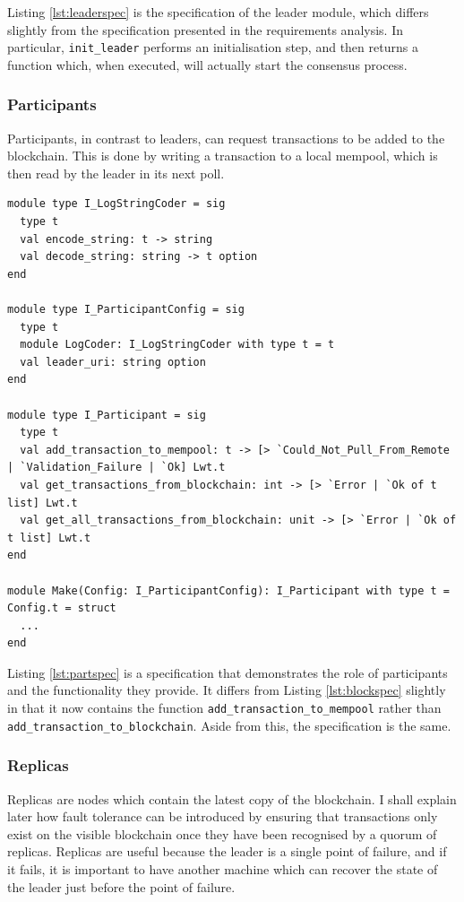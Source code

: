 \documentclass[12pt,a4paper,twoside,openright]{report}
\begin{document}
	Listing \ref{lst:leaderspec} is the specification of the leader module, which differs slightly from the specification presented in the requirements analysis.
	In particular, \texttt{init\_leader} performs an initialisation step, and then returns a function which, when executed, will actually start the consensus process.

	\subsubsection*{Participants}
	Participants, in contrast to leaders, can request transactions to be added to the blockchain. 
	This is done by writing a transaction to a local mempool, which is then read by the leader in its next poll.\\

	\begin{lstlisting}[caption={Participant Specification},label={lst:partspec}]
module type I_LogStringCoder = sig
  type t
  val encode_string: t -> string
  val decode_string: string -> t option
end

module type I_ParticipantConfig = sig
  type t
  module LogCoder: I_LogStringCoder with type t = t
  val leader_uri: string option
end

module type I_Participant = sig
  type t
  val add_transaction_to_mempool: t -> [> `Could_Not_Pull_From_Remote | `Validation_Failure | `Ok] Lwt.t
  val get_transactions_from_blockchain: int -> [> `Error | `Ok of t list] Lwt.t
  val get_all_transactions_from_blockchain: unit -> [> `Error | `Ok of t list] Lwt.t
end

module Make(Config: I_ParticipantConfig): I_Participant with type t = Config.t = struct
  ...
end
	\end{lstlisting}

	Listing \ref{lst:partspec} is a specification that demonstrates the role of participants and the functionality they provide.
	It differs from Listing \ref{lst:blockspec} slightly in that it now contains the function \texttt{add\_transaction\_to\_mempool} rather than \texttt{add\_transaction\_to\_blockchain}.
	Aside from this, the specification is the same.

	\subsubsection*{Replicas}
	Replicas are nodes which contain the latest copy of the blockchain. 
	I shall explain later how fault tolerance can be introduced by ensuring that transactions only exist on the visible blockchain once they have been recognised by a quorum of replicas.
	Replicas are useful because the leader is a single point of failure, and if it fails, it is important to have another machine which can recover the state of the leader just before the point of failure.
	
\end{document}
